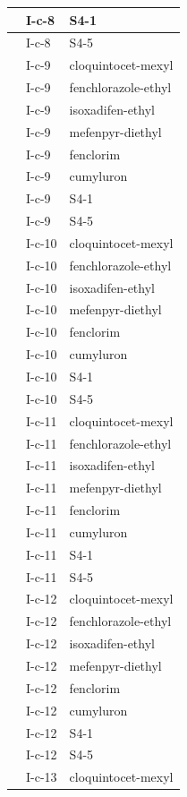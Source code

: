 \documentclass[11pt,a4paper]{article}
\begin{document}
\begin{table}[h]
\begin{tabular}{|l|l|l|}
 & I-c-8 & S4-1 \\ \hline
 & I-c-8 & S4-5 \\ \hline
 & I-c-9 & cloquintocet-mexyl \\ \hline
 & I-c-9 & fenchlorazole-ethyl \\ \hline
 & I-c-9 & isoxadifen-ethyl \\ \hline
 & I-c-9 & mefenpyr-diethyl \\ \hline
 & I-c-9 & fenclorim \\ \hline
 & I-c-9 & cumyluron \\ \hline
 & I-c-9 & S4-1 \\ \hline
 & I-c-9 & S4-5 \\ \hline
 & I-c-10 & cloquintocet-mexyl \\ \hline
 & I-c-10 & fenchlorazole-ethyl \\ \hline
 & I-c-10 & isoxadifen-ethyl \\ \hline
 & I-c-10 & mefenpyr-diethyl \\ \hline
 & I-c-10 & fenclorim \\ \hline
 & I-c-10 & cumyluron \\ \hline
 & I-c-10 & S4-1 \\ \hline
 & I-c-10 & S4-5 \\ \hline
 & I-c-11 & cloquintocet-mexyl \\ \hline
 & I-c-11 & fenchlorazole-ethyl \\ \hline
 & I-c-11 & isoxadifen-ethyl \\ \hline
 & I-c-11 & mefenpyr-diethyl \\ \hline
 & I-c-11 & fenclorim \\ \hline
 & I-c-11 & cumyluron \\ \hline
 & I-c-11 & S4-1 \\ \hline
 & I-c-11 & S4-5 \\ \hline
 & I-c-12 & cloquintocet-mexyl \\ \hline
 & I-c-12 & fenchlorazole-ethyl \\ \hline
 & I-c-12 & isoxadifen-ethyl \\ \hline
 & I-c-12 & mefenpyr-diethyl \\ \hline
 & I-c-12 & fenclorim \\ \hline
 & I-c-12 & cumyluron \\ \hline
 & I-c-12 & S4-1 \\ \hline
 & I-c-12 & S4-5 \\ \hline
 & I-c-13 & cloquintocet-mexyl \\ \hline

\end{tabular}
\end{table}
\end{document}
